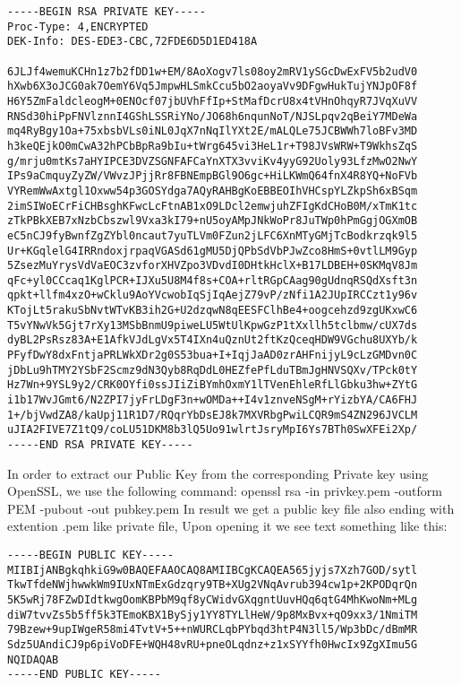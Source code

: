 \documentclass[11pt]{article}
\begin{document}
\begin{verbatim}
-----BEGIN RSA PRIVATE KEY-----
Proc-Type: 4,ENCRYPTED
DEK-Info: DES-EDE3-CBC,72FDE6D5D1ED418A

6JLJf4wemuKCHn1z7b2fDD1w+EM/8AoXogv7ls08oy2mRV1ySGcDwExFV5b2udV0
hXwb6X3oJCG0ak7OemY6Vq5JmpwHLSmkCcu5bO2aoyaVv9DFgwHukTujYNJpOF8f
H6Y5ZmFaldcleogM+0ENOcf07jbUVhFfIp+StMafDcrU8x4tVHnOhqyR7JVqXuVV
RNSd30hiPpFNVlznnI4GShLSSRiYNo/JO68h6nqunNoT/NJSLpqv2qBeiY7MDeWa
mq4RyBgy1Oa+75xbsbVLs0iNL0JqX7nNqIlYXt2E/mALQLe75JCBWWh7loBFv3MD
h3keQEjkO0mCwA32hPCbBpRa9bIu+tWrg645vi3HeL1r+T98JVsWRW+T9WkhsZqS
g/mrju0mtKs7aHYIPCE3DVZSGNFAFCaYnXTX3vviKv4yyG92Uoly93LfzMwO2NwY
IPs9aCmquyZyZW/VWvzJPjjRr8FBNEmpBGl9O6gc+HiLKWmQ64fnX4R8YQ+NoFVb
VYRemWwAxtgl1Oxww54p3GOSYdga7AQyRAHBgKoEBBEOIhVHCspYLZkpSh6xBSqm
2imSIWoECrFiCHBsghKFwcLcFtnAB1xO9LDcl2emwjuhZFIgKdCHoB0M/xTmK1tc
zTkPBkXEB7xNzbCbszwl9Vxa3kI79+nU5oyAMpJNkWoPr8JuTWp0hPmGgjOGXmOB
eC5nCJ9fyBwnfZgZYbl0ncaut7yuTLVm0FZun2jLFC6XnMTyGMjTcBodkrzqk9l5
Ur+KGqlelG4IRRndoxjrpaqVGASd61gMU5DjQPbSdVbPJwZco8HmS+0vtlLM9Gyp
5ZsezMuYrysVdVaEOC3zvforXHVZpo3VDvdI0DHtkHclX+B17LDBEH+0SKMqV8Jm
qFc+yl0CCcaq1KglPCR+IJXu5U8M4f8s+COA+rltRGpCAag90gUdnqRSQdXsft3n
qpkt+llfm4xzO+wCklu9AoYVcwobIqSjIqAejZ79vP/zNfi1A2JUpIRCCzt1y96v
KTojLt5rakuSbNvtWTvKB3ih2G+U2dzqwN8qEESFClhBe4+oogcehzd9zgUKxwC6
T5vYNwVk5Gjt7rXy13MSbBnmU9piweLU5WtUlKpwGzP1tXxllh5tclbmw/cUX7ds
dyBL2PsRsz83A+E1AfkVJdLgVx5T4IXn4uQznUt2ftKzQceqHDW9VGchu8UXYb/k
PFyfDwY8dxFntjaPRLWkXDr2g0S53bua+I+IqjJaAD0zrAHFnijyL9cLzGMDvn0C
jDbLu9hTMY2YSbF2Scmz9dN3Qyb8RqDdL0HEZfePfLduTBmJgHNVSQXv/TPck0tY
Hz7Wn+9YSL9y2/CRK0OYfi0ssJIiZiBYmhOxmY1lTVenEhleRfLlGbku3hw+ZYtG
i1b17WvJGmt6/N2ZPI7jyFrLDgF3n+wOMDa++I4v1znveNSgM+rYizbYA/CA6FHJ
1+/bjVwdZA8/kaUpj11R1D7/RQqrYbDsEJ8k7MXVRbgPwiLCQR9mS4ZN296JVCLM
uJIA2FIVE7Z1tQ9/coLU51DKM8b3lQ5Uo91wlrtJsryMpI6Ys7BTh0SwXFEi2Xp/
-----END RSA PRIVATE KEY-----
\end{verbatim}

In order to extract our Public Key from the corresponding Private key using OpenSSL, we use the following command: \newline \newline openssl rsa -in privkey.pem -outform PEM -pubout -out pubkey.pem \newline \newline In result we get a public key file also ending with extention .pem like private file, Upon opening it we see text something like this:


\begin{verbatim}
-----BEGIN PUBLIC KEY-----
MIIBIjANBgkqhkiG9w0BAQEFAAOCAQ8AMIIBCgKCAQEA565jyjs7Xzh7GOD/sytl
TkwTfdeNWjhwwkWm9IUxNTmExGdzqry9TB+XUg2VNqAvrub394cw1p+2KPODqrQn
5K5wRj78FZwDIdtkwgOomKBPbM9qf8yCWidvGXqgntUuvHQq6qtG4MhKwoNm+MLg
diW7tvvZs5b5ff5k3TEmoKBX1BySjy1YY8TYLlHeW/9p8MxBvx+qO9xx3/1NmiTM
79Bzew+9upIWgeR58mi4TvtV+5++nWURCLqbPYbqd3htP4N3ll5/Wp3bDc/dBmMR
Sdz5UAndiCJ9p6piVoDFE+WQH48vRU+pneOLqdnz+z1xSYYfh0HwcIx9ZgXImu5G
NQIDAQAB
-----END PUBLIC KEY-----
\end{verbatim}
\end{document}
